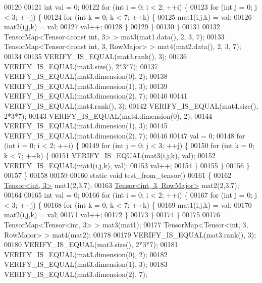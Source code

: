 \begin{DoxyCode}
00120 
00121   \textcolor{keywordtype}{int} val = 0;
00122   \textcolor{keywordflow}{for} (\textcolor{keywordtype}{int} i = 0; i < 2; ++i) \{
00123     \textcolor{keywordflow}{for} (\textcolor{keywordtype}{int} j = 0; j < 3; ++j) \{
00124       \textcolor{keywordflow}{for} (\textcolor{keywordtype}{int} k = 0; k < 7; ++k) \{
00125         mat1(i,j,k) = val;
00126         mat2(i,j,k) = val;
00127         val++;
00128       \}
00129     \}
00130   \}
00131 
00132   TensorMap<Tensor<const int, 3> > mat3(mat1.data(), 2, 3, 7);
00133   TensorMap<Tensor<const int, 3, RowMajor> > mat4(mat2.data(), 2, 3, 7);
00134 
00135   VERIFY\_IS\_EQUAL(mat3.rank(), 3);
00136   VERIFY\_IS\_EQUAL(mat3.size(), 2*3*7);
00137   VERIFY\_IS\_EQUAL(mat3.dimension(0), 2);
00138   VERIFY\_IS\_EQUAL(mat3.dimension(1), 3);
00139   VERIFY\_IS\_EQUAL(mat3.dimension(2), 7);
00140 
00141   VERIFY\_IS\_EQUAL(mat4.rank(), 3);
00142   VERIFY\_IS\_EQUAL(mat4.size(), 2*3*7);
00143   VERIFY\_IS\_EQUAL(mat4.dimension(0), 2);
00144   VERIFY\_IS\_EQUAL(mat4.dimension(1), 3);
00145   VERIFY\_IS\_EQUAL(mat4.dimension(2), 7);
00146 
00147   val = 0;
00148   \textcolor{keywordflow}{for} (\textcolor{keywordtype}{int} i = 0; i < 2; ++i) \{
00149     \textcolor{keywordflow}{for} (\textcolor{keywordtype}{int} j = 0; j < 3; ++j) \{
00150       \textcolor{keywordflow}{for} (\textcolor{keywordtype}{int} k = 0; k < 7; ++k) \{
00151         VERIFY\_IS\_EQUAL(mat3(i,j,k), val);
00152         VERIFY\_IS\_EQUAL(mat4(i,j,k), val);
00153         val++;
00154       \}
00155     \}
00156   \}
00157 \}
00158 
00159 
00160 \textcolor{keyword}{static} \textcolor{keywordtype}{void} test\_from\_tensor()
00161 \{
00162   \hyperlink{class_eigen_1_1_tensor}{Tensor<int, 3>} mat1(2,3,7);
00163   \hyperlink{class_eigen_1_1_tensor}{Tensor<int, 3, RowMajor>} mat2(2,3,7);
00164 
00165   \textcolor{keywordtype}{int} val = 0;
00166   \textcolor{keywordflow}{for} (\textcolor{keywordtype}{int} i = 0; i < 2; ++i) \{
00167     \textcolor{keywordflow}{for} (\textcolor{keywordtype}{int} j = 0; j < 3; ++j) \{
00168       \textcolor{keywordflow}{for} (\textcolor{keywordtype}{int} k = 0; k < 7; ++k) \{
00169         mat1(i,j,k) = val;
00170         mat2(i,j,k) = val;
00171         val++;
00172       \}
00173     \}
00174   \}
00175 
00176   TensorMap<Tensor<int, 3> > mat3(mat1);
00177   TensorMap<Tensor<int, 3, RowMajor> > mat4(mat2);
00178 
00179   VERIFY\_IS\_EQUAL(mat3.rank(), 3);
00180   VERIFY\_IS\_EQUAL(mat3.size(), 2*3*7);
00181   VERIFY\_IS\_EQUAL(mat3.dimension(0), 2);
00182   VERIFY\_IS\_EQUAL(mat3.dimension(1), 3);
00183   VERIFY\_IS\_EQUAL(mat3.dimension(2), 7);

\end{DoxyCode}
